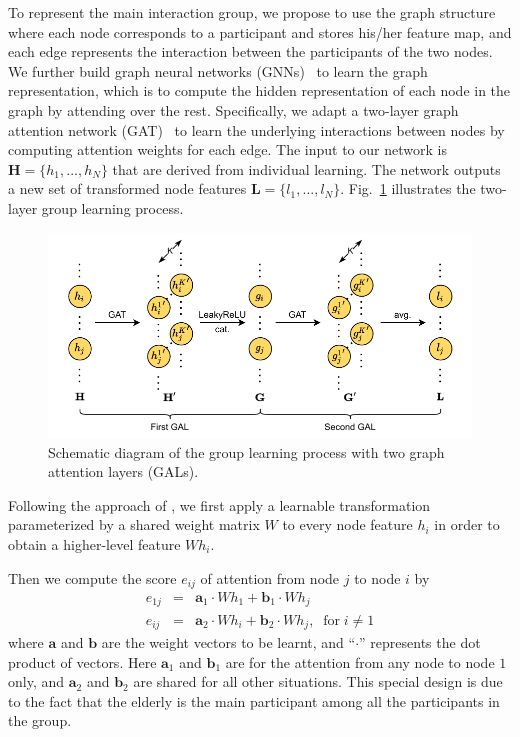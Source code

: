 \documentclass[VANCOUVER,STIX1COL]{WileyNJD-v2}
\begin{document}
To represent the main interaction group, we propose to use the graph structure where each node corresponds to a participant and stores his/her feature map, and each edge represents the interaction between the participants of the two nodes. We further build graph neural networks (GNNs)~\cite{Scarselli2008Graph} to learn the graph representation, which is to compute the hidden representation of each node in the graph by attending over the rest. Specifically, we adapt a two-layer graph attention network (GAT)~\cite{Velivckovic2017Graph} to learn the underlying interactions between nodes by computing attention weights for each edge. The input to our network is $\mathbf{H} = \{h_1, ..., h_N\}$ that are derived from individual learning. The network outputs a new set of transformed node features $\mathbf{L} = \{l_1, ..., l_N\}$. Fig.~\ref{f:group_learning} illustrates the two-layer group learning process.

\begin{figure}[hb]
  \centering
  \includegraphics[width=0.72\linewidth]{assets/group_learning}
  \caption{Schematic diagram of the group learning process with two graph attention layers (GALs).}
  \label{f:group_learning}
\end{figure}

Following the approach of \cite{Velivckovic2017Graph}, we first apply a learnable transformation parameterized by a shared weight matrix $W$ to every node feature $h_i$ in order to obtain a higher-level feature $W h_i$.

Then we compute the score $e_{ij}$ of attention from node $j$ to node $i$ by
\begin{eqnarray}
\label{eq:e1j}
e_{1j} &=& \mathbf{a}_1\cdot W h_1 +   \mathbf{b}_1 \cdot W h_j \\
e_{ij} &=& \mathbf{a}_2\cdot W h_i +   \mathbf{b}_2 \cdot W h_j, \;\; \text{for}\; i \neq 1
\end{eqnarray}
where $\mathbf{a}$ and $\mathbf{b}$ are the weight vectors to be learnt, and ``$\cdot$'' represents the dot product of vectors. Here $\mathbf{a}_1$ and $\mathbf{b}_1$ are for the attention from any node to node $1$ only, and $\mathbf{a}_2$ and $\mathbf{b}_2$ are shared for all other situations. This special design is due to the fact that the elderly is the main participant among all the participants in the group.
\end{document}
